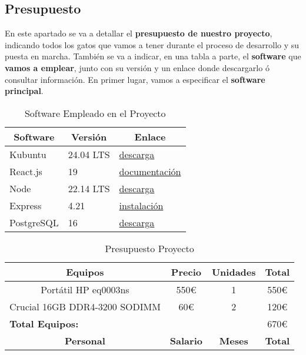 \subsection{Presupuesto}
En este apartado se va a detallar el \textbf{presupuesto de nuestro proyecto}, indicando todos los gatos que vamos a tener durante el proceso de desarrollo y su puesta en marcha. También se va a indicar, en una tabla a parte, el \textbf{software} que \textbf{vamos a emplear}, junto con su versión y un enlace donde descargarlo ó consultar información. En primer lugar, vamos a especificar el \textbf{software principal}.

\begin{table}[H]
	\begin{center}
		\bgroup
		\def\arraystretch{1.5}
		\begin{tabular}{| p{4cm} | p{4cm} | p{4cm} |}
			\hline
			\multicolumn{1}{|c|}{\textbf{Software}} & \multicolumn{1}{|c|}{\textbf{Versión}} &  \multicolumn{1}{|c|}{\textbf{Enlace}} \\ \hline
			Kubuntu & 24.04 LTS & \href{https://kubuntu.org/getkubuntu/}{descarga} \\ \hline
			React.js & 19 & \href{https://react.dev/}{documentación} \\ \hline
			Node & 22.14 LTS & \href{https://nodejs.org/es/download}{descarga} \\ \hline
			Express & 4.21 & \href{https://expressjs.com/es/starter/installing.html}{instalación} \\ \hline
			PostgreSQL & 16 & \href{https://www.postgresql.org/download/}{descarga} \\ \hline
		\end{tabular}	
		\egroup
		\caption{Software Empleado en el Proyecto}
	\end{center}
\end{table}


\begin{table}[H]
	\begin{center}
		\bgroup
		\def\arraystretch{1.5}
		\begin{tabular}{| c | c | c | c |}
			\hline
			\textbf{Equipos} & \textbf{Precio} &  \textbf{Unidades} & \textbf{Total} \\ \hline
			Portátil  HP eq0003ns & 550€ & 1 & 550€ \\ \hline
			Crucial 16GB DDR4-3200 SODIMM & 60€ & 2 & 120€ \\ \hline
			\multicolumn{3}{|l|}{\textbf{Total Equipos:}} & 670€ \\ \hline
			\textbf{Personal} & \textbf{Salario} &  \textbf{Meses} & \textbf{Total} \\ \hline
		\end{tabular}	
		\egroup
		\caption{Presupuesto Proyecto}
	\end{center}
\end{table}






